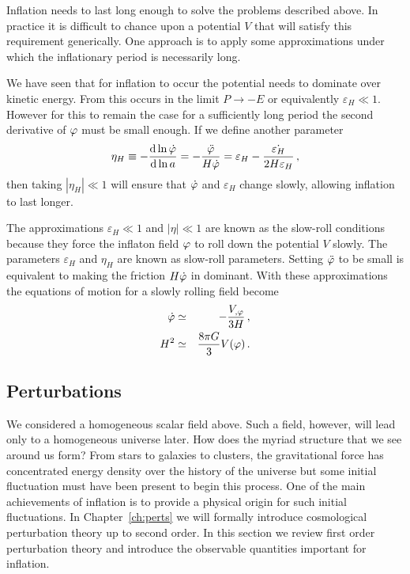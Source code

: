 Inflation needs to last long enough to solve the problems described above. In
practice it is difficult to chance upon a potential $V$ that will satisfy this
requirement generically. One approach is to apply some approximations under
which the inflationary period is necessarily long. 

We have seen that for
inflation to occur the potential needs to dominate over kinetic energy. From
 this occurs in the limit $P\rightarrow -E$ or equivalently
$\varepsilon_H \ll 1$. However for this to remain the case for a sufficiently long
period the second derivative of $\varphi$ must be small enough. If we define
another parameter 
% 
\begin{equation}
 \label{eq:etaHdefn-intro}
 \eta_H \equiv -\frac{\mathrm{d} \ln \dot{\varphi}}{\mathrm{d} \ln a} =
-\frac{\ddot{\varphi}}{H\dot{\varphi}}
 =\varepsilon_H -\frac{\dot{\varepsilon_H}}{2H\varepsilon_H}\,,
\end{equation}
% 
then taking $|\eta_H|\ll 1$ will ensure that $\dot{\varphi}$ and $\varepsilon_H$
change slowly, allowing inflation to last longer.

The approximations $\varepsilon_H\ll 1$ and $|\eta|\ll 1$ are known as the
slow-roll conditions because they force the inflaton field $\varphi$ to roll down
the potential $V$ slowly. The parameters $\varepsilon_H$ and $\eta_H$ are known as
slow-roll parameters. Setting $\ddot{\varphi}$ to be small is equivalent to
making the friction $H\dot{\varphi}$ in  dominant. With
these approximations the
equations of motion for a slowly rolling field become
% 
\begin{eqnarray}
 \dot{\varphi} &\simeq& - \frac{V_{,\varphi}}{3H}\,, \\
 H^2 &\simeq& \frac{8\pi G}{3}V(\varphi)\,.
\end{eqnarray}




\subsection{Perturbations}
\label{sec:perts-intro}

We considered a homogeneous scalar field above. Such a field, however, will
lead only to a homogeneous universe later. How does the myriad structure
that we see around us form? From stars to galaxies to clusters, the
gravitational force has concentrated energy density over the history of the
universe but some initial fluctuation must have been present to begin this
process. One of the main achievements of inflation is to provide a physical
origin for
such initial fluctuations. In Chapter~\ref{ch:perts} we will formally introduce
cosmological perturbation theory up to second order. In this section we 
review first order perturbation theory and introduce the observable quantities
important for inflation.


